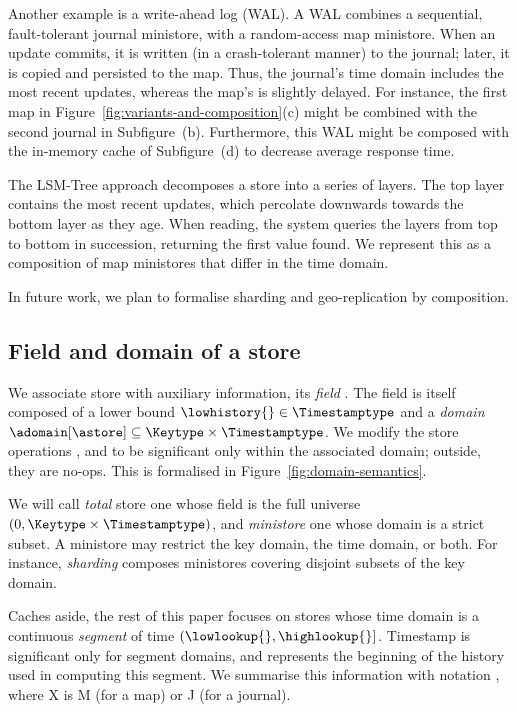Another example is a write-ahead log (WAL).
A WAL combines a sequential, fault-tolerant journal ministore, with a
random-access map ministore.
When an update commits, it is written (in a crash-tolerant manner) to
the journal; later, it is copied and persisted to the map.
Thus, the journal's time domain includes the most recent updates,
whereas the map's is slightly delayed.
For instance, the first map in
Figure~\ref{fig:variants-and-composition}(c) might be combined with the
second journal in Subfigure~(b).
Furthermore, this WAL might be composed with the in-memory cache of
Subfigure~(d) to decrease average response time.

The LSM-Tree approach \cite{app:1730} decomposes a store into a series
of layers.
The top layer contains the most recent updates, which percolate
downwards towards the bottom layer as they age.
When reading, the system queries the layers from top to bottom in
succession, returning the first value found.
We represent this as a composition of map ministores that differ in the
time domain.

In future work, we plan to formalise sharding and geo-replication
\cite{rep:pro:sh182} by composition.

\subsection{Field and domain of a store}
\label{sec:domain}

We associate store \astore{} with auxiliary information, its
\emph{field} \afield[\astore{}].
The field is itself composed of a lower bound $\lowhistory{} \in
\Timestamptype$ and a \emph{domain} $\adomain[\astore] \subseteq {\Keytype
  \times \Timestamptype}$.
We modify the store operations \lookup{}, \doUpdate{} and \doCommit{}
to be significant only within the associated domain; outside, they are
no-ops.
This is formalised in Figure~\ref{fig:domain-semantics}.

We will call \emph{total} store one whose field is the full
universe $(0, \Keytype \times \Timestamptype)$, and
\emph{ministore} one whose domain is a strict subset.
A ministore may restrict the key domain, the time domain, or both.
For instance, \emph{sharding} composes ministores covering disjoint
subsets of the key domain.

Caches aside, the rest of this paper focuses on stores whose time domain
is a continuous \emph{segment} of time $(\lowlookup{}, \highlookup{}]$.
Timestamp \lowhistory{} is significant only for segment domains, and
represents the beginning of the history used in computing this segment.
We summarise this information with notation
, where X
is M (for a map) or J (for a journal).

